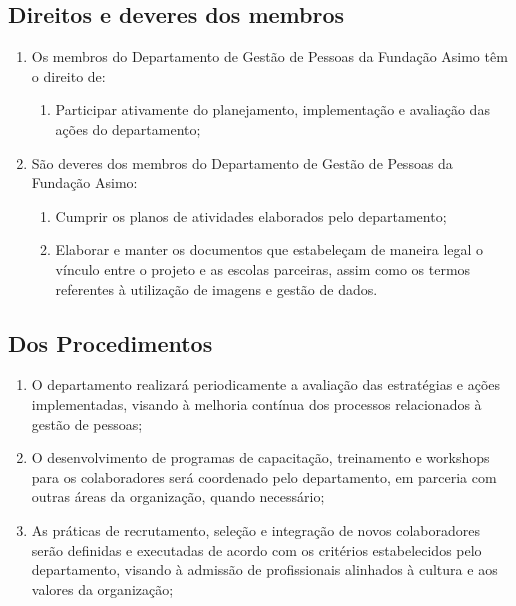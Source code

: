         \subsection{Direitos e deveres dos membros}   
        \begin{enumerate}
            \item Os membros do Departamento de Gestão de Pessoas da Fundação Asimo têm o direito de:
            \begin{enumerate}
                \item Participar ativamente do planejamento, implementação e avaliação das ações do departamento;
            \end{enumerate}
            \item São deveres dos membros do Departamento de Gestão de Pessoas da Fundação Asimo:
            \begin{enumerate}
                \item Cumprir os planos de atividades elaborados pelo departamento;
                \item Elaborar e manter os documentos que estabeleçam de maneira legal o vínculo entre o projeto e as escolas parceiras, assim como os termos referentes à utilização de imagens e gestão de dados.
            \end{enumerate}
        \end{enumerate}
        
        \subsection{Dos Procedimentos}
            \begin{enumerate}
                \item O departamento realizará periodicamente a avaliação das estratégias e ações implementadas, visando à melhoria contínua dos processos relacionados à gestão de pessoas;
                \item O desenvolvimento de programas de capacitação, treinamento e workshops para os colaboradores será coordenado pelo departamento, em parceria com outras áreas da organização, quando necessário;
                \item As práticas de recrutamento, seleção e integração de novos colaboradores serão definidas e executadas de acordo com os critérios estabelecidos pelo departamento, visando à admissão de profissionais alinhados à cultura e aos valores da organização;
                
            \end{enumerate}
            
